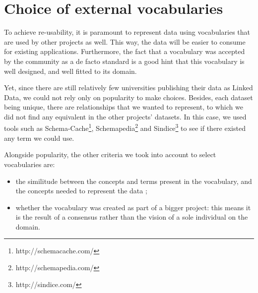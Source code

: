 \documentclass[a4paper,11pt]{report}
\begin{document}
\section{Choice of external vocabularies}
To achieve re-usability, it is paramount to represent data using vocabularies that are used by other projects as well. This way, the data will be easier to consume for existing applications. Furthermore, the fact that a vocabulary was accepted by the community as a de facto standard is a good hint that this vocabulary is well designed, and well fitted to its domain. 

Yet, since there are still relatively few universities publishing their data as Linked Data, we could not rely only on popularity to make choices. Besides, each dataset being unique, there are relationships that we wanted to represent, to which we did not find any equivalent in the other projects' datasets. In this case, we used tools such as Schema-Cache\footnote{http://schemacache.com/}, Schemapedia\footnote{http://schemapedia.com/} and Sindice\footnote{http://sindice.com/} to see if there existed any term we could use. 

Alongside popularity, the other criteria we took into account to select vocabularies are:
\begin{itemize}
\item the similitude between the concepts and terms present in the vocabulary, and the concepts needed to represent the data ;
\item whether the vocabulary was created as part of a bigger project: this means it is the result of a consensus rather than the vision of a sole individual on the domain.
\end{itemize}
\end{document}
